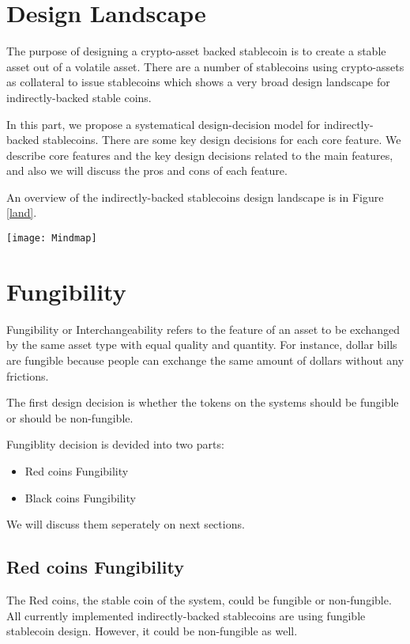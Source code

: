 \section{Design Landscape}
The purpose of designing a crypto-asset backed stablecoin is to create a stable asset out of a volatile asset. There are a number of stablecoins using crypto-assets as collateral to issue stablecoins which shows a very broad design landscape for indirectly-backed stable coins.

In this part, we propose a systematical design-decision model for indirectly-backed stablecoins. There are some key design decisions for each core feature. We describe core features and the key design decisions related to the main features, and also we will discuss the pros and cons of each feature.

An overview of the indirectly-backed stablecoins design landscape is in Figure \ref{land}.

\begin{figure*} [ht]
\centering
\texttt{[image: Mindmap]}
\caption{overview of the indirectly-backed stablecoins design landscape}
\label{land}
\end{figure*}

\section{Fungibility}
Fungibility or Interchangeability refers to the feature of an asset to be exchanged by the same asset type with equal quality and quantity. For instance, dollar bills are fungible because people can exchange the same amount of dollars without any frictions.

The first design decision is whether the tokens on the systems should be fungible or should be non-fungible. 

Fungiblity decision is devided into two parts:
\begin{itemize}
  \item Red coins Fungibility
  \item Black coins Fungibility
\end{itemize} 
We will discuss them seperately on next sections.


\subsection{Red coins Fungibility}
The Red coins, the stable coin of the system, could be fungible or non-fungible. All currently implemented indirectly-backed stablecoins are using fungible stablecoin design. However, it could be non-fungible as well.

